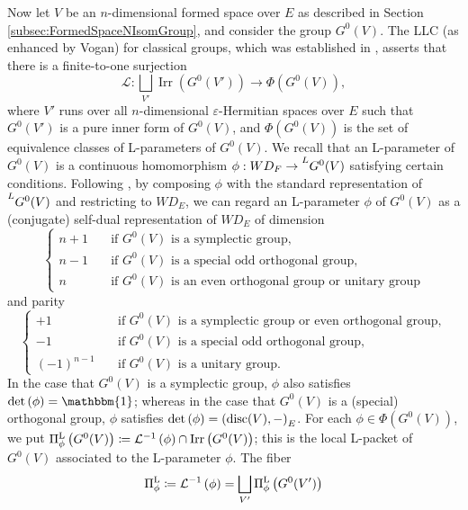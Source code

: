 \documentclass[11pt,letterpaper]{amsart}
\theoremstyle{plain}
\numberwithin{theorem}{section}
\numberwithin{equation}{subsection}
\theoremstyle{remark}
\newcommand{\Irr}{\operatorname{Irr}}
\newcommand{\disc}{{\rm disc}}
\def\calL{\mathcal{L}}
\def\ra{\rightarrow}
\def\lra{\longrightarrow}
\def\LP{\Pi^{\rm L}} %
\begin{document}
\vskip 5pt

Now let $V$ be an $n$-dimensional formed space over $E$ as described in Section \ref{subsec:FormedSpaceNIsomGroup}, and consider the group $G^0(V)$. The LLC (as enhanced by Vogan) for classical groups, which was established in \cite{MR3135650, MR3338302, MR3708200, MR4308934, MR4324358, MR4776199}, asserts that there is a finite-to-one surjection
\[
    \calL: \bigsqcup_{V'} \Irr\left(G^0(V')\right) \lra \Phi\left(G^0(V)\right),
\]
where $V'$ runs over all $n$-dimensional $\varepsilon$-Hermitian spaces over $E$ such that $G^0(V')$ is a pure inner form of $G^0(V)$, and $\Phi\left(G^0(V)\right)$ is the set of equivalence classes of L-parameters of $G^0(V)$. We recall that an L-parameter of $G^0(V)$ is a continuous homomorphism $\phi: WD_F \ra \prescript{L}{}{G^0(V)}$ satisfying certain conditions. Following \cite[Sect. 8]{MR3202556}, by composing $\phi$ with the standard representation of $\prescript{L}{}{G^0(V)}$ and restricting to $WD_E$, we can regard an L-parameter $\phi$ of $G^0(V)$ as a (conjugate) self-dual representation of $WD_E$ of dimension
\[
    \begin{cases}
    n+1 \quad & \text{if $G^0(V)$ is a symplectic group},\\[5pt]
    n-1 \quad & \text{if $G^0(V)$ is a special odd orthogonal group},\\[5pt]
    n \quad & \text{if $G^0(V)$ is an even orthogonal group or unitary group}
    \end{cases}
\]
and parity
\[
    \begin{cases}
    +1 \quad & \text{if $G^0(V)$ is a symplectic group or even orthogonal group},\\[5pt]
    -1 \quad & \text{if $G^0(V)$ is a special odd orthogonal group},\\[5pt]
    (-1)^{n-1} \quad & \text{if $G^0(V)$ is a unitary group}.
    \end{cases}
\]
In the case that $G^0(V)$ is a symplectic group, $\phi$ also satisfies $\det\left(\phi\right) = \mathbbm{1}$; whereas in the case that $G^0(V)$ is a (special) orthogonal group, $\phi$ satisfies $\det\left(\phi\right) = \left(\disc(V),-\right)_E$. For each $\phi\in\Phi\left(G^0(V)\right)$, we put $\LP_\phi\left(G^0(V)\right)\coloneqq \calL^{-1}\left(\phi\right)\cap \Irr\left(G^0(V)\right)$; this is the local L-packet of $G^0\left(V\right)$ associated to the L-parameter $\phi$. The fiber 
\begin{equation*}
    \LP_\phi \coloneqq \calL^{-1}\left(\phi\right) = \bigsqcup_{V'} \LP_\phi\left(G^0(V')\right)
\end{equation*}
\end{document}
